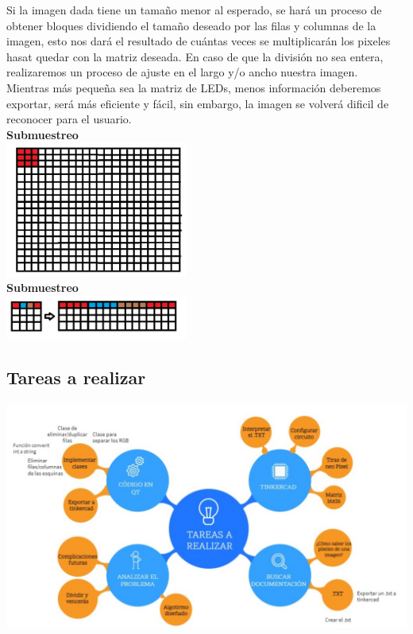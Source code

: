 \documentclass{article}
\begin{document}
Si la imagen dada tiene un tamaño menor al esperado, se hará un proceso de obtener bloques dividiendo el tamaño deseado por las filas y columnas de la imagen, esto nos dará el resultado de cuántas veces se multiplicarán los pixeles hasat quedar con la matriz deseada. En caso de que la división no sea entera, realizaremos un proceso de ajuste en el largo y/o ancho nuestra imagen. \\

Mientras más pequeña sea la matriz de LEDs, menos información deberemos exportar, será más eficiente y fácil, sin embargo, la imagen se volverá dificil de reconocer para el usuario.\\

\textbf{Submuestreo}\\
\includegraphics[width=6cm]{Imagenes/submuestreo.jpeg}\\
\textbf{Submuestreo}\\
\includegraphics[width=6cm]{Imagenes/sobremuestreo.jpeg}\\

\vspace{0,3cm}

\subsection{Tareas a realizar}
\includegraphics[width=15cm]{Imagenes/Esquema.jpeg}
\end{document}
